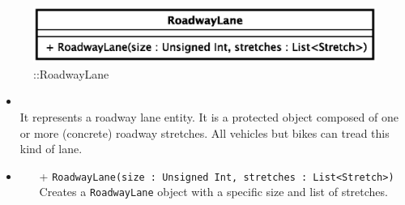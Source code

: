 \begin{figure}[h]
\centering
\includegraphics[scale=0.6,keepaspectratio]{images/solution/roadway_lane.eps}
\caption{\pReactiveComponentLane::RoadwayLane}
\label{fig:sd-app-roadway_lane}
\end{figure}
\FloatBarrier
\begin{itemize}
  \item \textbf{\descr} \\
    It represents a roadway lane entity. It is a protected object composed of
    one or more (concrete) roadway stretches. All vehicles but bikes can tread
    this kind of lane.
  \item \textbf{\ops}
  \begin{itemize}
  \item[+] \texttt{RoadwayLane(size : Unsigned Int, stretches : List<Stretch>)} \\
  Creates a \texttt{RoadwayLane} object with a specific size and list of stretches.
  \end{itemize}   
\end{itemize}
